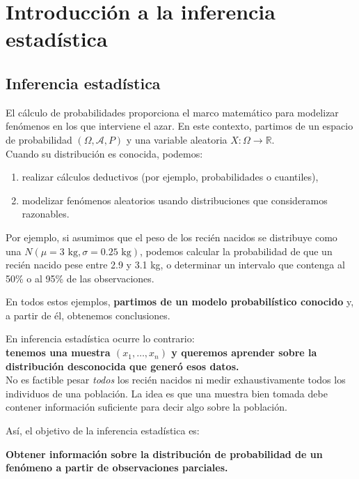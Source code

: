 \documentclass[
]{article}
\providecommand{\tightlist}{%
  \setlength{\itemsep}{0pt}\setlength{\parskip}{0pt}}
\begin{document}
\newpage

\section{Introducción a la inferencia estadística}\label{introducciuxf3n-a-la-inferencia-estaduxedstica}

\subsection{Inferencia estadística}\label{inferencia-estaduxedstica}

El cálculo de probabilidades proporciona el marco matemático para modelizar fenómenos en los que interviene el azar. En este contexto, partimos de un espacio de probabilidad \((\Omega, \mathcal{A}, P)\) y una variable aleatoria \(X: \Omega \to \mathbb{R}\).\\
Cuando su distribución es conocida, podemos:

\begin{enumerate}
\def\labelenumi{\arabic{enumi}.}
\tightlist
\item
  realizar cálculos deductivos (por ejemplo, probabilidades o cuantiles),
\item
  modelizar fenómenos aleatorios usando distribuciones que consideramos razonables.
\end{enumerate}

Por ejemplo, si asumimos que el peso de los recién nacidos se distribuye como una \(N(\mu=3\text{ kg}, \sigma=0.25\text{ kg})\), podemos calcular la probabilidad de que un recién nacido pese entre 2.9 y 3.1 kg, o determinar un intervalo que contenga al 50\% o al 95\% de las observaciones.

En todos estos ejemplos, \textbf{partimos de un modelo probabilístico conocido} y, a partir de él, obtenemos conclusiones.

En inferencia estadística ocurre lo contrario:\\
\textbf{tenemos una muestra \((x_1, \ldots, x_n)\) y queremos aprender sobre la distribución desconocida que generó esos datos.}\\
No es factible pesar \emph{todos} los recién nacidos ni medir exhaustivamente todos los individuos de una población. La idea es que una muestra bien tomada debe contener información suficiente para decir algo sobre la población.

Así, el objetivo de la inferencia estadística es:

\textbf{Obtener información sobre la distribución de probabilidad de un fenómeno a partir de observaciones parciales.}
\end{document}
